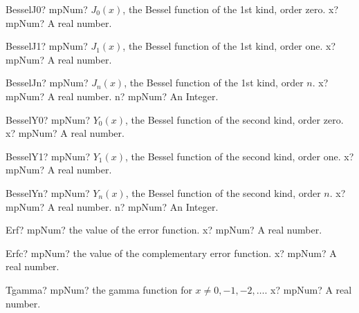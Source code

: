 \documentclass[12pt,a4paper,openany]{book}
\begin{document}
\begin{mpFunctionsExtract}
\mpFunctionOne
{BesselJ0? mpNum? $J_0(x)$, the Bessel function of the 1st kind, order zero.}
{x? mpNum? A real number.}
\end{mpFunctionsExtract}

\begin{mpFunctionsExtract}
\mpFunctionOne
{BesselJ1? mpNum? $J_1(x)$, the Bessel function of the 1st kind, order one.}
{x? mpNum? A real number.}
\end{mpFunctionsExtract}

\begin{mpFunctionsExtract}
\mpFunctionTwo
{BesselJn? mpNum? $J_n(x)$, the Bessel function of the 1st kind, order $n$.}
{x? mpNum? A real number.}
{n? mpNum? An Integer.}
\end{mpFunctionsExtract}

\begin{mpFunctionsExtract}
\mpFunctionOne
{BesselY0? mpNum? $Y_0(x)$, the Bessel function of the second kind, order zero.}
{x? mpNum? A real number.}
\end{mpFunctionsExtract}

\begin{mpFunctionsExtract}
\mpFunctionOne
{BesselY1? mpNum? $Y_1(x)$, the Bessel function of the second kind, order one.}
{x? mpNum? A real number.}
\end{mpFunctionsExtract}

\begin{mpFunctionsExtract}
\mpFunctionTwo
{BesselYn? mpNum? $Y_n(x)$, the Bessel function of the second kind, order $n$.}
{x? mpNum? A real number.}
{n? mpNum? An Integer.}
\end{mpFunctionsExtract}

\begin{mpFunctionsExtract}
\mpFunctionOne
{Erf? mpNum? the value of the error function.}
{x? mpNum? A real number.}
\end{mpFunctionsExtract}

\begin{mpFunctionsExtract}
\mpFunctionOne
{Erfc? mpNum? the value of the complementary error function.}
{x? mpNum? A real number.}
\end{mpFunctionsExtract}

\begin{mpFunctionsExtract}
\mpFunctionOne
{Tgamma? mpNum? the gamma function for $x \neq 0, -1, -2,\ldots$.}
{x? mpNum? A real number.}
\end{mpFunctionsExtract}
\end{document}
